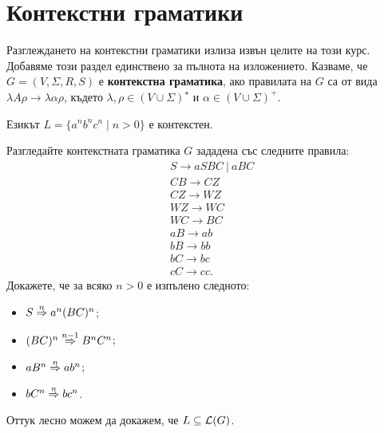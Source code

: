 \section{Контекстни граматики}

Разглеждането на контекстни граматики излиза извън целите на този курс. Добавяме този раздел единствено за пълнота на изложението.
Казваме, че $G = (V,\Sigma,R,S)$ е {\bf контекстна граматика}, ако правилата на $G$ са от вида
$\lambda A \rho \to \lambda \alpha \rho$, където $\lambda,\rho \in (V\cup\Sigma)^\star$ и $\alpha \in (V\cup\Sigma)^+$.

\begin{extra}
\begin{example}
  Езикът $L = \{a^nb^nc^n \mid n > 0\}$ е контекстен.
\end{example}
\begin{hint}
  Разгледайте контекстната граматика $G$ зададена със следните правила:
  \begin{align*}
    & S \to aSBC\ |\ aBC\\
    & CB \to CZ\\
    & CZ \to WZ\\
    & WZ \to WC\\
    & WC \to BC\\
    & aB \to ab\\
    & bB \to bb\\
    & bC \to bc\\
    & cC \to cc.
  \end{align*}
  Докажете, че за всяко $n > 0$ е изпълено следното:
  \begin{itemize}
  \item
    $S \stackrel{{n}}{\Rightarrow} a^n(BC)^n$;
  \item
    $(BC)^n \stackrel{{n-1}}{\Rightarrow} B^nC^n$;
  \item
    $aB^n \stackrel{{n}}{\Rightarrow} ab^n$;
  \item
    $bC^n \stackrel{{n}}{\Rightarrow} bc^n$.
  \end{itemize}
  Оттук лесно можем да докажем, че $L \subseteq \mathcal{L}(G)$.
\end{hint}
\end{extra}
